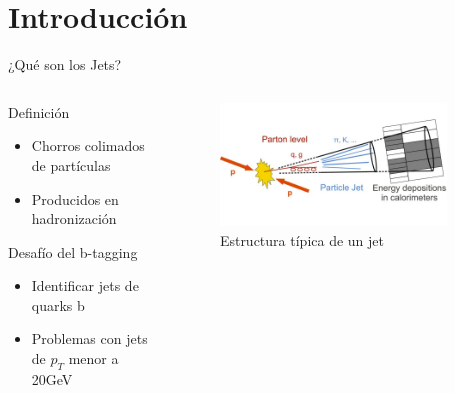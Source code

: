\documentclass[aspectratio=169]{beamer}
\begin{document}
\section{Introducción}
\begin{frame}{¿Qué son los Jets?}
  \begin{columns}
    \begin{column}{0.45\textwidth}
      \begin{block}{Definición}
        \begin{itemize}
          \item Chorros colimados de partículas
          \item Producidos en hadronización
        \end{itemize}
      \end{block}
      \begin{alertblock}{Desafío del b-tagging}
        \begin{itemize}
          \item Identificar jets de quarks b
          \item Problemas con jets de \texorpdfstring{$p_T$}{pT} menor a 20GeV
        \end{itemize}
      \end{alertblock}
    \end{column}
    \begin{column}{0.55\textwidth}
      \begin{figure}
        \includegraphics[width=0.9\textwidth]{jet1.png}
        \caption{Estructura típica de un jet}
      \end{figure}
    \end{column}
  \end{columns}
\end{frame}
\end{document}
